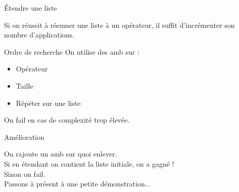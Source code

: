 \documentclass{beamer}
\begin{document}
\begin{frame}{Étendre une liste}
  \begin{center}
  Si on réussit à résumer une liste à un opérateur, il suffit d'incrémenter son nombre d'applications.
  \end{center}
\end{frame}

\begin{frame}{Ordre de recherche}
  On utilise des amb sur :
  \begin{itemize}
    \item{Opérateur}
    \item{Taille}
    \item{Répéter sur une liste}
  \end{itemize}
  On fail en cas de complexité trop élevée.
\end{frame}

\begin{frame}{Amélioration}
  \begin{center}
  On rajoute un amb sur quoi enlever.\\
  Si en étendant on contient la liste initiale, on a gagné !\\Sinon on fail.\\

  Passons à présent à une petite démonstration...
  \end{center}
\end{frame}

  
\end{document}
